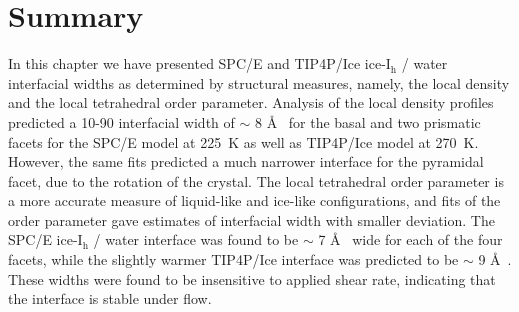 \section{Summary}
In this chapter we have presented SPC/E and TIP4P/Ice
ice-I$_\mathrm{h}$ / water interfacial widths as determined by
structural measures, namely, the local density and the local
tetrahedral order parameter. Analysis of the local density profiles
predicted a 10-90 interfacial width of $\sim$ 8 \AA~ for the basal and
two prismatic facets for the SPC/E model at 225~K as well as TIP4P/Ice
model at 270~K. However, the same fits predicted a much narrower
interface for the pyramidal facet, due to the rotation of the
crystal. The local tetrahedral order parameter is a more accurate
measure of liquid-like and ice-like configurations, and fits of the
order parameter gave estimates of interfacial width with smaller
deviation. The SPC/E ice-I$_\mathrm{h}$ / water interface was found to
be $\sim$ 7 \AA~ wide for each of the four facets, while the slightly
warmer TIP4P/Ice interface was predicted to be $\sim$ 9 \AA~. These
widths were found to be insensitive to applied shear rate, indicating
that the interface is stable under flow.

